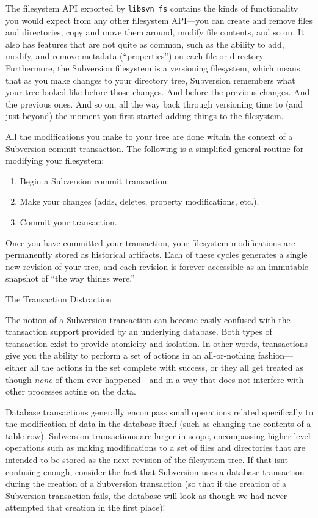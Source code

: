 The filesystem API exported by \texttt{libsvn\_fs} contains the kinds of
functionality you would expect from any other filesystem API---you can
create and remove files and directories, copy and move them around,
modify file contents, and so on. It also has features that are not quite
as common, such as the ability to add, modify, and remove metadata
(``properties'') on each file or directory. Furthermore, the Subversion
filesystem is a versioning filesystem, which means that as you make
changes to your directory tree, Subversion remembers what your tree
looked like before those changes. And before the previous changes. And
the previous ones. And so on, all the way back through versioning time
to (and just beyond) the moment you first started adding things to the
filesystem.

All the modifications you make to your tree are done within the context
of a Subversion commit transaction. The following is a simplified
general routine for modifying your filesystem:

\begin{enumerate}
\def\labelenumi{\arabic{enumi}.}
\item
  Begin a Subversion commit transaction.
\item
  Make your changes (adds, deletes, property modifications, etc.).
\item
  Commit your transaction.
\end{enumerate}

Once you have committed your transaction, your filesystem modifications
are permanently stored as historical artifacts. Each of these cycles
generates a single new revision of your tree, and each revision is
forever accessible as an immutable snapshot of ``the way things were.''

The Transaction Distraction

The notion of a Subversion transaction can become easily confused with
the transaction support provided by an underlying database. Both types of
transaction exist to provide atomicity and isolation. In other words,
transactions give you the ability to perform a set of actions in an
all-or-nothing fashion---either all the actions in the set complete with
success, or they all get treated as though \emph{none} of them ever
happened---and in a way that does not interfere with other processes
acting on the data.

Database transactions generally encompass small operations related
specifically to the modification of data in the database itself (such as
changing the contents of a table row). Subversion transactions are
larger in scope, encompassing higher-level operations such as making
modifications to a set of files and directories that are intended to be
stored as the next revision of the filesystem tree. If that
isn\textquotesingle t confusing enough, consider the fact that
Subversion uses a database transaction during the creation of a
Subversion transaction (so that if the creation of a Subversion
transaction fails, the database will look as though we had never
attempted that creation in the first place)!

